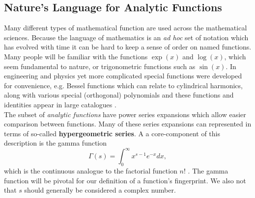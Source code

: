\documentclass{article}
\begin{document}
\subsection{Nature's Language for Analytic Functions}
Many different types of mathematical function are used across the mathematical sciences. Because the language of mathematics is an \emph{ad hoc} set of notation which has evolved with time it can be hard to keep a sense of order on named functions. Many people will be familiar with the functions $\exp(x)$ and $\log(x)$, which seem fundamental to nature, or trigonometric functions such as $\sin(x)$. In engineering and physics yet more complicated special functions were developed for convenience, e.g. Bessel functions which can relate to cylindrical harmonics, along with various special (orthogonal) polynomials and these functions and identities appear in large catalogues \cite{Kolbig1995}. \\

The subset of \emph{analytic functions} have power series expansions which allow easier comparison between functions. Many of these series expansions can represented in terms of so-called \textbf{hypergeometric series}. A a core-component of this description is the gamma function
\begin{equation}
\Gamma(s) = \int_0^\infty x^{s-1} e^{-x}dx,
\end{equation}
which is the continuous analogue to the factorial function $n!$ \cite{Fikioris2006,Kolbig1995}. The gamma function will be pivotal for our definition of a function's fingerprint. We also not that $s$ should generally be considered a complex number.\\
\end{document}
